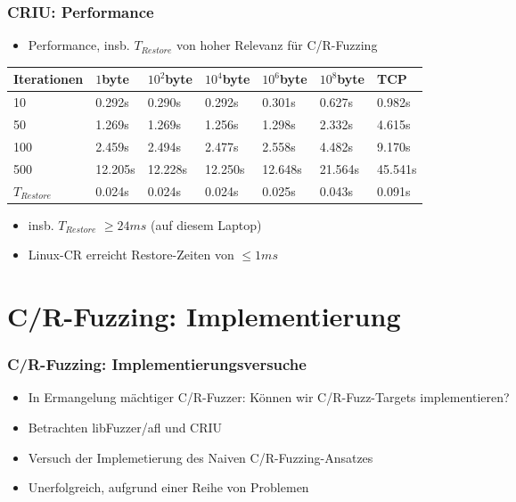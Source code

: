 \documentclass[handout]{beamer}
\begin{document}
\begin{frame}
    \frametitle{CRIU: Performance}
    \begin{itemize}
        \item Performance, insb. $T_{Restore}$ von hoher Relevanz für C/R-Fuzzing
    \end{itemize}

\begin{tabular}{| l | l  l  l  l  l | l |}
    \toprule
    Iterationen & $1$byte & $10^2$byte & $10^4$byte & $10^6$byte & $10^8$byte & TCP \\
    \midrule
    10 & 0.292s & 0.290s & 0.292s & 0.301s & 0.627s & 0.982s \\
    50 & 1.269s & 1.269s & 1.256s & 1.298s & 2.332s & 4.615s \\
    100 & 2.459s & 2.494s & 2.477s & 2.558s & 4.482s & 9.170s \\
    500 & 12.205s & 12.228s & 12.250s & 12.648s & 21.564s & 45.541s \\
    \midrule
    $T_{Restore}$ & 0.024s & 0.024s & 0.024s & 0.025s & 0.043s & 0.091s \\
    \bottomrule
\end{tabular}
    \begin{itemize}
        \item insb. $T_{Restore}$ $\geq 24ms$ (auf diesem Laptop)
        \item Linux-CR erreicht Restore-Zeiten von $\leq 1ms$
    \end{itemize}

\end{frame}

\section{C/R-Fuzzing: Implementierung}
\begin{frame}
    \frametitle{C/R-Fuzzing: Implementierungsversuche}
    \begin{itemize}
        \item In Ermangelung mächtiger C/R-Fuzzer: Können wir C/R-Fuzz-Targets implementieren?
        \item Betrachten libFuzzer/afl und CRIU
        \item Versuch der Implemetierung des Naiven C/R-Fuzzing-Ansatzes
        \item Unerfolgreich, aufgrund einer Reihe von Problemen
    \end{itemize}
\end{frame}
\end{document}

